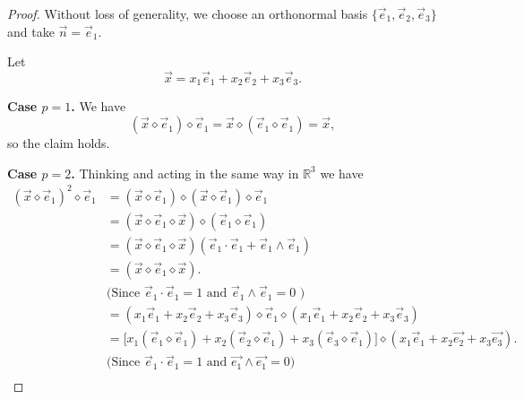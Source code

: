 \documentclass[10pt,a4paper]{amsart}
\begin{document}
\begin{proof}
Without loss of generality, we choose an orthonormal basis
$\{\vec e_1,\vec e_2,\vec e_3\}$ and take $\vec n=\vec e_1$.

Let
\[
\vec x = x_1\vec e_1 + x_2\vec e_2 + x_3\vec e_3.
\]

\textbf{Case $p=1$.}
We have
\[
(\vec x\diamond \vec e_1)\diamond \vec e_1
=
\vec x\diamond (\vec e_1\diamond \vec e_1)
=
\vec x,
\]
so the claim holds.

\medskip

\textbf{Case $p=2$.}
Thinking and acting in the same way in $\mathbb{R}^{3}$ we have
\begin{align*}
\left( \vec{x} \diamond \vec{e}_{1} \right)^{2} \diamond \vec{e}_{1}
&= \left( \vec{x} \diamond \vec{e}_{1} \right) \diamond 
   \left( \vec{x} \diamond \vec{e}_{1} \right) \diamond \vec{e}_{1} \\[4pt]
&= \left( \vec{x} \diamond \vec{e}_{1} \diamond \vec{x} \right)
   \diamond \left( \vec{e}_{1} \diamond \vec{e}_{1} \right) \\[4pt]
&= \left( \vec{x} \diamond \vec{e}_{1} \diamond \vec{x} \right)
   \left( \vec{e}_{1} \cdot \vec{e}_{1} + \vec{e}_{1} \wedge \vec{e}_{1} \right) \\[4pt]
&= \left( \vec{x} \diamond \vec{e}_{1} \diamond \vec{x} \right) .\\
& \text{(Since $\vec{e}_{1} \cdot \vec{e}_{1} = 1$ and $\vec{e}_{1} \wedge \vec{e}_{1} = 0$ )}\\[4pt]
&= \left( 
x_{1}\vec{e}_{1} + x_{2}\vec{e}_{2} + x_{3}\vec{e}_{3}
\right)
\diamond \vec{e}_{1}
\diamond 
\left(
x_{1}\vec{e}_{1} + x_{2}\vec{e}_{2} + x_{3}\vec{e}_{3}
\right) \\[6pt]
&= \Big[
x_{1}\left( \vec{e}_{1} \diamond \vec{e}_{1} \right)
+ x_{2}\left( \vec{e}_{2} \diamond \vec{e}_{1} \right)
+ x_{3}\left( \vec{e}_{3} \diamond \vec{e}_{1} \right)
\Big] \diamond
\left(
x_{1}\vec{e}_{1} + x_{2}\vec{e_2} + x_{3}\vec{e_3}
\right).\\[4pt]
& \text{(Since $\vec{e}_{1} \cdot \vec{e}_{1} = 1$ and $\vec{e_1} \wedge \vec{e_1} = 0$)}\\[4pt]

\end{align*}
\end{proof}
\end{document}
